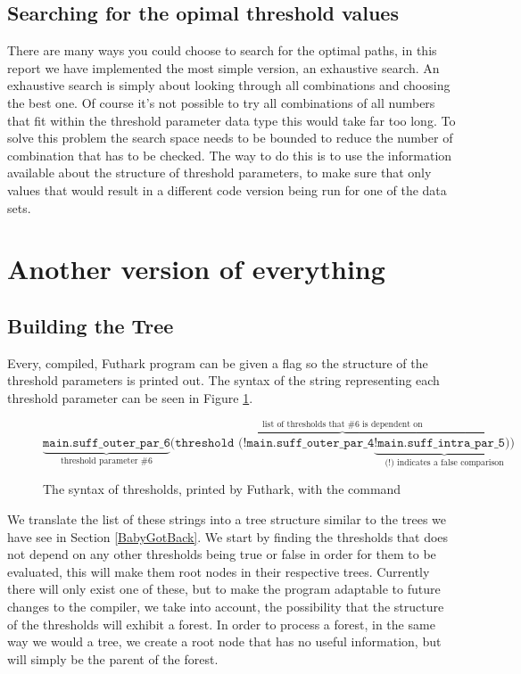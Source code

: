 \subsection{Searching for the opimal threshold values}
There are many ways you could choose to search for the optimal paths, in this
report we have implemented the most simple version, an exhaustive search. An
exhaustive search is simply about looking through all combinations and choosing
the best one. Of course it's not possible to try all combinations of all numbers
that fit within the threshold parameter data type this would take far too long. 
To solve this problem the search space needs to be bounded to reduce the number
of combination that has to be checked. The way to do this is to use the
information available about the structure of threshold parameters, to make sure
that only values that would result in a different code version being run for 
one of the data sets. 

\section{Another version of everything}
\subsection{Building the Tree}
Every, compiled, Futhark program can be given a flag so the structure of the threshold 
parameters is printed out. The syntax of the string representing each threshold parameter
can be seen in Figure \ref{thresholdSyntax}.
\begin{figure}[h]
	$$\underbrace{\texttt{main.suff\_outer\_par\_6}}_\text{threshold parameter \#6} \overbrace{\texttt{(threshold (!main.suff\_outer\_par\_4} \underbrace{\texttt{!main.suff\_intra\_par\_5))}}_\text{(!) indicates a false comparison}}^\text{list of thresholds that \#6 is dependent on}$$
	\caption{The syntax of thresholds, printed by Futhark, with the command}
	\label{thresholdSyntax}
\end{figure}
We translate the list of these strings into a tree structure similar to the
trees we have see in Section \ref{BabyGotBack}. 
We start by finding the thresholds that does not depend on any other thresholds
being true or false in order for them to be evaluated, this will make them root nodes in their respective trees. Currently there will only exist one of these, but to make the program
adaptable to future changes to the compiler, we take into account, the possibility that the
structure of the thresholds will exhibit a forest. In order to process a forest, in the same way we would a tree, 
we create a root node that has no useful information, but will simply be the
parent of the forest. \\

